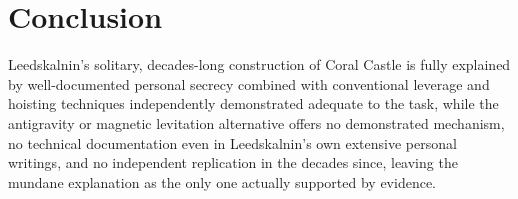 \documentclass[11pt]{article}
\begin{document}
\section{Conclusion}

Leedskalnin's solitary, decades-long construction of Coral Castle is fully explained by well-documented personal secrecy combined with conventional leverage and hoisting techniques independently demonstrated adequate to the task, while the antigravity or magnetic levitation alternative offers no demonstrated mechanism, no technical documentation even in Leedskalnin's own extensive personal writings, and no independent replication in the decades since, leaving the mundane explanation as the only one actually supported by evidence.
\end{document}
